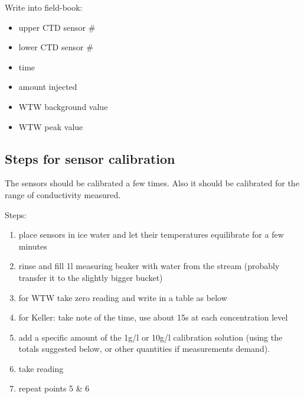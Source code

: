 \documentclass[DIV=15,halfparskip,11pt,headinclude]{scrartcl}
\begin{document}
Write into field-book:
\begin{itemize}
\item upper CTD sensor \#
\item lower CTD sensor \#
\item time
\item amount injected
\item WTW background value
\item WTW peak value
\end{itemize}



\subsection{Steps for sensor calibration}
\label{sec-2-3}

The sensors should be calibrated a few times.  Also it should be
calibrated for the range of conductivity measured.

Steps:
\begin{enumerate}
\item place sensors in ice water and let their temperatures
  equilibrate for a few minutes
\item rinse and fill 1l measuring beaker with water from the stream (probably
  transfer it to the slightly bigger bucket)
\item for WTW take zero reading and write in a table as below
\item for Keller: take note of the time, use about 15s at each
  concentration level
\item add a specific amount of the 1g/l or 10g/l calibration solution (using
  the totals suggested below, or other quantities if measurements
  demand).
\item take reading
\item repeat points 5 \& 6
\end{enumerate}
\end{document}
